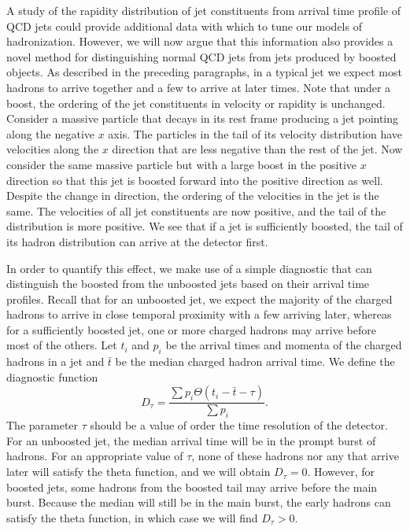 A study of the rapidity distribution of jet constituents from arrival time profile of QCD jets could provide additional data with which to tune our models of hadronization.
However, we will now argue that this information also provides a novel method for distinguishing normal QCD jets from jets produced by boosted objects.
As described in the preceding paragraphs, in a typical jet we expect most hadrons to arrive together and a few to arrive at later times.
Note that under a boost, the ordering of the jet constituents in velocity or rapidity is unchanged.
Consider a massive particle that decays in its rest frame producing a jet pointing along the negative $x$ axis.
The particles in the tail of its velocity distribution have velocities along the $x$ direction that are less negative than the rest of the jet.
Now consider the same massive particle but with a large boost in the positive $x$ direction so that this jet is boosted forward into the positive direction as well.
Despite the change in direction, the ordering of the velocities in the jet is the same.
The velocities of all jet constituents are now positive, and the tail of the distribution is more positive.
We see that if a jet is sufficiently boosted, the tail of its hadron distribution can arrive at the detector first.

In order to quantify this effect, we make use of a simple diagnostic that can distinguish the boosted from the unboosted jets based on their arrival time profiles.
Recall that for an unboosted jet, we expect the majority of the charged hadrons to arrive in close temporal proximity with a few arriving later, whereas for a sufficiently boosted jet, one or more charged hadrons may arrive before most of the others.
Let $t_i$ and $p_{i}$ be the arrival times and momenta of the charged hadrons in a jet and $\bar t$ be the median charged hadron arrival time.
We define the diagnostic function
\begin{equation}
	D_\tau = \frac{ \sum p_{i} \Theta(t_i-\bar t-\tau) }{ \sum p_{i} }.
\end{equation}
The parameter $\tau$ should be a value of order the time resolution of the detector.
For an unboosted jet, the median arrival time will be in the prompt burst of hadrons.
For an appropriate value of $\tau$, none of these hadrons nor any that arrive later will satisfy the theta function, and we will obtain $D_\tau=0$.
However, for boosted jets, some hadrons from the boosted tail may arrive before the main burst. Because the median will still be in the main burst, the early hadrons can satisfy the theta function, in which case we will find $D_\tau>0$.

